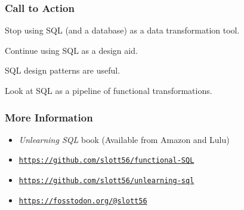 \documentclass{beamer}
\begin{document}
\begin{frame}
    \frametitle{Call to Action}
    Stop using SQL (and a database) as a data transformation tool.

    \vspace{1em}
    Continue using SQL as a design aid.

    \vspace{1em}
    SQL design patterns are useful.

    \vspace{1em}
    Look at SQL as a pipeline of functional transformations.
\end{frame}

\begin{frame}
    \frametitle{More Information}

    \begin{itemize}
        \item \textit{Unlearning SQL} book (Available from Amazon and Lulu) \vspace{1em}
        \item \texttt{\underline{https://github.com/slott56/functional-SQL}} \vspace{1em}
        \item \texttt{\underline{https://github.com/slott56/unlearning-sql}} \vspace{1em}
        \item \texttt{\underline{https://fosstodon.org/@slott56}}
    \end{itemize}

    \begin{center}
    \end{center}

\end{frame}
\end{document}
